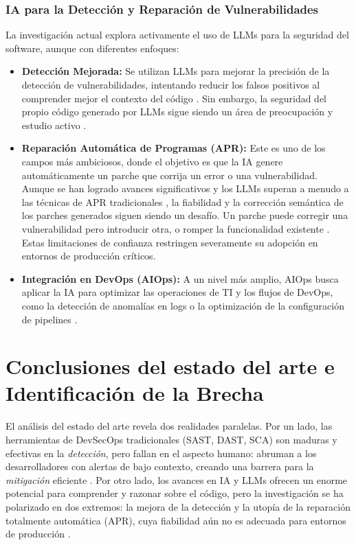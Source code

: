 \subsubsection{IA para la Detección y Reparación de Vulnerabilidades}
La investigación actual explora activamente el uso de LLMs para la seguridad del software, aunque con diferentes enfoques:
\begin{itemize}
    \item \textbf{Detección Mejorada:} Se utilizan LLMs para mejorar la precisión de la detección de vulnerabilidades, intentando reducir los falsos positivos al comprender mejor el contexto del código \cite{GitHubAICodeReviews}. Sin embargo, la seguridad del propio código generado por LLMs sigue siendo un área de preocupación y estudio activo \cite{GitGuardian2025CopilotConcerns}.
    
    \item \textbf{Reparación Automática de Programas (APR):} Este es uno de los campos más ambiciosos, donde el objetivo es que la IA genere automáticamente un parche que corrija un error o una vulnerabilidad. Aunque se han logrado avances significativos y los LLMs superan a menudo a las técnicas de APR tradicionales \cite{Liu2024APRSurvey}, la fiabilidad y la corrección semántica de los parches generados siguen siendo un desafío. Un parche puede corregir una vulnerabilidad pero introducir otra, o romper la funcionalidad existente \cite{Fu2023Patching}. Estas limitaciones de confianza restringen severamente su adopción en entornos de producción críticos.
    
    \item \textbf{Integración en DevOps (AIOps):} A un nivel más amplio, AIOps busca aplicar la IA para optimizar las operaciones de TI y los flujos de DevOps, como la detección de anomalías en logs o la optimización de la configuración de pipelines \cite{Iglesia2021AIOps}.
\end{itemize}

\section{Conclusiones del estado del arte e Identificación de la Brecha}\label{sec:conclusionesSOTA}
El análisis del estado del arte revela dos realidades paralelas. Por un lado, las herramientas de DevSecOps tradicionales (SAST, DAST, SCA) son maduras y efectivas en la \textit{detección}, pero fallan en el aspecto humano: abruman a los desarrolladores con alertas de bajo contexto, creando una barrera para la \textit{mitigación} eficiente \cite{Johnson2023UsabilitySAST}. Por otro lado, los avances en IA y LLMs ofrecen un enorme potencial para comprender y razonar sobre el código, pero la investigación se ha polarizado en dos extremos: la mejora de la detección y la utopía de la reparación totalmente automática (APR), cuya fiabilidad aún no es adecuada para entornos de producción \cite{Liu2024APRSurvey}.

